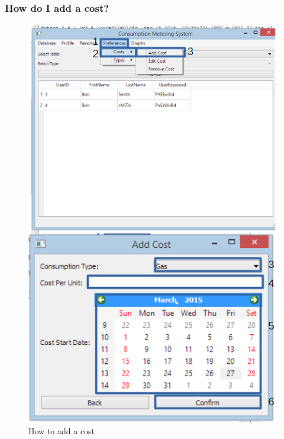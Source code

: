 \subsubsection{How do I add a cost?}\label{question:add_cost}
\begin{figure}[H]
	\includegraphics{./manual/images/add_cost.png}
	\caption{How to add a cost}
\end{figure}


